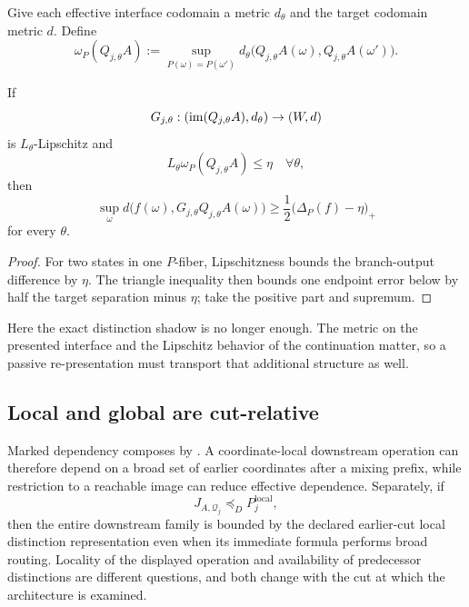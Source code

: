 Give each effective interface codomain a metric $d_\theta$ and the target codomain metric $d$. Define
\[
\omega_P(Q_{j,\theta}A)
:=
\sup_{P(\omega)=P(\omega')}
 d_\theta\bigl(Q_{j,\theta}A(\omega),Q_{j,\theta}A(\omega')\bigr).
\]

\begin{theorem}\label{thm:approx-context-v13}
If
\[
G_{j,\theta}:(\operatorname{im}(Q_{j,\theta}A),d_\theta)\to(W,d)
\]
is $L_\theta$-Lipschitz and
\[
L_\theta\omega_P(Q_{j,\theta}A)\le\eta
\quad\forall\theta,
\]
then
\[
\boxed{
\sup_\omega d\bigl(f(\omega),G_{j,\theta}Q_{j,\theta}A(\omega)\bigr)
\ge
\frac12\bigl(\Delta_P(f)-\eta\bigr)_+
}
\]
for every $\theta$.
\end{theorem}

\begin{proof}
For two states in one $P$-fiber, Lipschitzness bounds the branch-output difference by $\eta$. The triangle inequality then bounds one endpoint error below by half the target separation minus $\eta$; take the positive part and supremum.
\end{proof}

Here the exact distinction shadow is no longer enough. The metric on the presented interface and the Lipschitz behavior of the continuation matter, so a passive re-presentation must transport that additional structure as well.

\subsection{Local and global are cut-relative}

Marked dependency composes by . A coordinate-local downstream operation can therefore depend on a broad set of earlier coordinates after a mixing prefix, while restriction to a reachable image can reduce effective dependence. Separately, if
\[
J_{A,\mathcal Q_j}\preceq_DP_j^{\mathrm{local}},
\]
then the entire downstream family is bounded by the declared earlier-cut local distinction representation even when its immediate formula performs broad routing. Locality of the displayed operation and availability of predecessor distinctions are different questions, and both change with the cut at which the architecture is examined.
